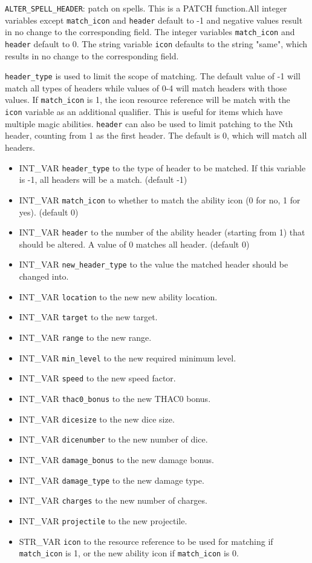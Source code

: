 \documentclass{article}
\begin{document}
\verb+ALTER_SPELL_HEADER+: patch  on spells. This is a PATCH function.All integer variables except \verb+match_icon+ and \verb+header+ default to -1 and negative values result in no change to the corresponding field. The integer variables \verb+match_icon+ and \verb+header+ default to 0. The string variable \verb+icon+ defaults to the string "same", which results in no change to the corresponding field.

\verb+header_type+ is used to limit the scope of matching. The default value of -1 will match all types of headers while values of 0-4 will match headers with those values. If \verb+match_icon+ is 1, the icon resource reference will be match with the \verb+icon+ variable as an additional qualifier. This is useful for items which have multiple magic abilities. \verb+header+ can also be used to limit patching to the Nth header, counting from 1 as the first header. The default is 0, which will match all headers.

\begin{itemize}
\item INT_VAR \verb+header_type+ to the type of header to be matched. If this variable is -1, all headers will be a match. (default -1)
\item INT_VAR \verb+match_icon+ to whether to match the ability icon (0 for no, 1 for yes). (default 0)
\item INT_VAR \verb+header+ to the number of the ability header (starting from 1) that should be altered. A value of 0 matches all header. (default 0)
\item INT_VAR \verb+new_header_type+ to the value the matched header should be changed into.
\item INT_VAR \verb+location+ to the new new ability location.
\item INT_VAR \verb+target+ to the new target.
\item INT_VAR \verb+range+ to the new range.
\item INT_VAR \verb+min_level+ to the new required minimum level.
\item INT_VAR \verb+speed+ to the new speed factor.
\item INT_VAR \verb+thac0_bonus+ to the new THAC0 bonus.
\item INT_VAR \verb+dicesize+ to the new dice size.
\item INT_VAR \verb+dicenumber+ to the new number of dice.
\item INT_VAR \verb+damage_bonus+ to the new damage bonus.
\item INT_VAR \verb+damage_type+ to the new damage type.
\item INT_VAR \verb+charges+ to the new number of charges.
\item INT_VAR \verb+projectile+ to the new projectile.
\item STR_VAR \verb+icon+ to the resource reference to be used for matching if \verb+match_icon+ is 1, or the new ability icon if \verb+match_icon+ is 0.
\end{itemize}
\\
\end{document}
